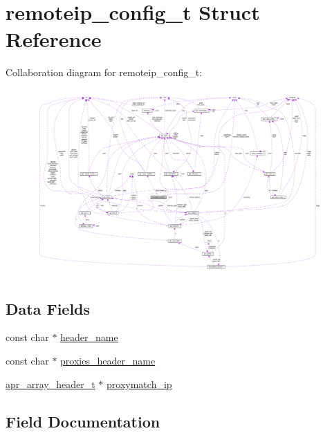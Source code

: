 \hypertarget{structremoteip__config__t}{}\section{remoteip\+\_\+config\+\_\+t Struct Reference}
\label{structremoteip__config__t}


Collaboration diagram for remoteip\+\_\+config\+\_\+t\+:
\nopagebreak
\begin{figure}[H]
\begin{center}
\leavevmode
\includegraphics[width=350pt]{structremoteip__config__t__coll__graph}
\end{center}
\end{figure}
\subsection*{Data Fields}
\begin{DoxyCompactItemize}
\item 
const char $\ast$ \hyperlink{structremoteip__config__t_a36e75762ecbda5fb7e8f2eb2ac237594}{header\+\_\+name}
\item 
const char $\ast$ \hyperlink{structremoteip__config__t_a82e836f2a33b91ac6d1c0ddb607b3ba6}{proxies\+\_\+header\+\_\+name}
\item 
\hyperlink{structapr__array__header__t}{apr\+\_\+array\+\_\+header\+\_\+t} $\ast$ \hyperlink{structremoteip__config__t_a5c081785f4a98e505c4ac785ac939143}{proxymatch\+\_\+ip}
\end{DoxyCompactItemize}


\subsection{Field Documentation}
